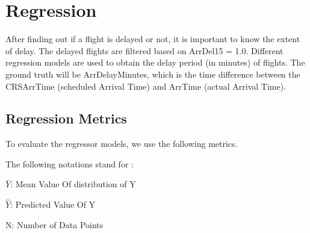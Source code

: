 \documentclass[12pt,letter-paper]{article}
\begin{document}
\section{Regression}

    After finding out if a flight is delayed or not, it is important to know the extent of delay. The delayed flights are filtered based on ArrDel15 = 1.0. Different regression models are used to obtain the delay period (in minutes) of flights. The ground truth will be ArrDelayMinutes, which is the time difference between the CRSArrTime (scheduled Arrival Time) and ArrTime (actual Arrival Time).
    
    \subsection{Regression Metrics}
 
        To evaluate the regressor models, we use the following metrics.
        
        \begin{flushleft}
        
            The following notations stand for : 
            
            $\bar{Y}$: Mean Value Of distribution of Y
        
            $\hat{Y}$: Predicted Value Of Y
        
            N: Number of Data Points
        
        \end{flushleft}
        
\end{document}
